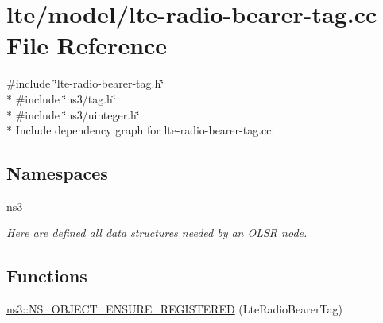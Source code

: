 \hypertarget{lte-radio-bearer-tag_8cc}{}\section{lte/model/lte-\/radio-\/bearer-\/tag.cc File Reference}
\label{lte-radio-bearer-tag_8cc}
{\ttfamily \#include \char`\"{}lte-\/radio-\/bearer-\/tag.\+h\char`\"{}}\\*
{\ttfamily \#include \char`\"{}ns3/tag.\+h\char`\"{}}\\*
{\ttfamily \#include \char`\"{}ns3/uinteger.\+h\char`\"{}}\\*
Include dependency graph for lte-\/radio-\/bearer-\/tag.cc\+:
\subsection*{Namespaces}
\begin{DoxyCompactItemize}
\item 
 \hyperlink{namespacens3}{ns3}
\begin{DoxyCompactList}\small\item\em Here are defined all data structures needed by an O\+L\+SR node. \end{DoxyCompactList}\end{DoxyCompactItemize}
\subsection*{Functions}
\begin{DoxyCompactItemize}
\item 
\hyperlink{namespacens3_a5f07d6ac76795fafa33ae366fa964b76}{ns3\+::\+N\+S\+\_\+\+O\+B\+J\+E\+C\+T\+\_\+\+E\+N\+S\+U\+R\+E\+\_\+\+R\+E\+G\+I\+S\+T\+E\+R\+ED} (Lte\+Radio\+Bearer\+Tag)
\end{DoxyCompactItemize}
